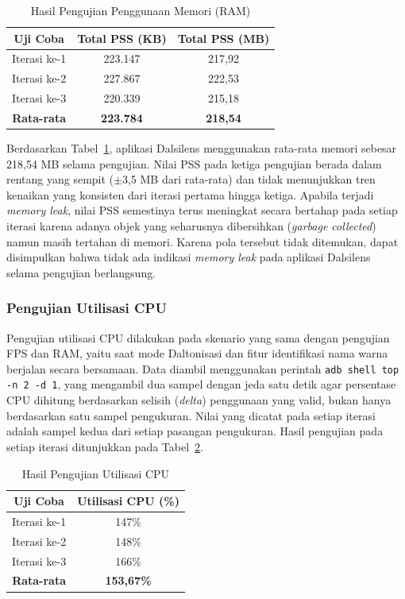 \begin{table}[H]
  \centering
  \caption{Hasil Pengujian Penggunaan Memori (RAM)}
  \label{tab:performa-ram}
  \begin{tabular}{|c|c|c|}
    \hline
    Uji Coba & Total PSS (KB) & Total PSS (MB) \\
    \hline
    Iterasi ke-1 & 223.147 & 217,92 \\
    \hline
    Iterasi ke-2 & 227.867 & 222,53 \\
    \hline
    Iterasi ke-3 & 220.339 & 215,18 \\
    \hline
    \textbf{Rata-rata} & \textbf{223.784} & \textbf{218,54} \\
    \hline
  \end{tabular}
\end{table}

Berdasarkan Tabel~\ref{tab:performa-ram}, aplikasi Dalsilens menggunakan rata-rata memori sebesar 218,54 MB selama pengujian.
Nilai PSS pada ketiga pengujian berada dalam rentang yang sempit ($\pm$3,5 MB dari rata-rata) dan tidak menunjukkan tren kenaikan yang konsisten dari iterasi pertama hingga ketiga.
Apabila terjadi \textit{memory leak}, nilai PSS semestinya terus meningkat secara bertahap pada setiap iterasi karena adanya objek yang seharusnya dibersihkan (\textit{garbage collected}) namun masih tertahan di memori.
Karena pola tersebut tidak ditemukan, dapat disimpulkan bahwa tidak ada indikasi \textit{memory leak} pada aplikasi Dalsilens selama pengujian berlangsung.

\subsubsection{Pengujian Utilisasi CPU}

Pengujian utilisasi CPU dilakukan pada skenario yang sama dengan pengujian FPS dan RAM, yaitu saat mode Daltonisasi dan fitur identifikasi nama warna berjalan secara bersamaan.
Data diambil menggunakan perintah \texttt{adb shell top -n 2 -d 1}, yang mengambil dua sampel dengan jeda satu detik agar persentase CPU dihitung berdasarkan selisih (\textit{delta}) penggunaan yang valid, bukan hanya berdasarkan satu sampel pengukuran.
Nilai yang dicatat pada setiap iterasi adalah sampel kedua dari setiap pasangan pengukuran.
Hasil pengujian pada setiap iterasi ditunjukkan pada Tabel~\ref{tab:performa-cpu}.

\begin{table}[H]
  \centering
  \caption{Hasil Pengujian Utilisasi CPU}
  \label{tab:performa-cpu}
  \begin{tabular}{|c|c|}
    \hline
    Uji Coba & Utilisasi CPU (\%) \\
    \hline
    Iterasi ke-1 & 147\% \\
    \hline
    Iterasi ke-2 & 148\% \\
    \hline
    Iterasi ke-3 & 166\% \\
    \hline
    \textbf{Rata-rata} & \textbf{153,67\%} \\
    \hline
  \end{tabular}
\end{table}

